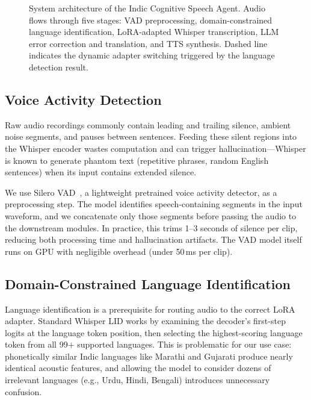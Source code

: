 \begin{figure}[t]
\caption{System architecture of the Indic Cognitive Speech Agent. Audio flows through five stages: VAD preprocessing, domain-constrained language identification, LoRA-adapted Whisper transcription, LLM error correction and translation, and TTS synthesis. Dashed line indicates the dynamic adapter switching triggered by the language detection result.}
\label{fig:architecture}
\end{figure}

\subsection{Voice Activity Detection}
\label{sec:vad}

Raw audio recordings commonly contain leading and trailing silence, ambient noise segments, and pauses between sentences. Feeding these silent regions into the Whisper encoder wastes computation and can trigger hallucination---Whisper is known to generate phantom text (repetitive phrases, random English sentences) when its input contains extended silence.

We use Silero VAD~\cite{silero_vad}, a lightweight pretrained voice activity detector, as a preprocessing step. The model identifies speech-containing segments in the input waveform, and we concatenate only those segments before passing the audio to the downstream modules. In practice, this trims 1--3 seconds of silence per clip, reducing both processing time and hallucination artifacts. The VAD model itself runs on GPU with negligible overhead (under 50\,ms per clip).

\subsection{Domain-Constrained Language Identification}
\label{sec:lid}

Language identification is a prerequisite for routing audio to the correct LoRA adapter. Standard Whisper LID works by examining the decoder's first-step logits at the language token position, then selecting the highest-scoring language token from all 99+ supported languages. This is problematic for our use case: phonetically similar Indic languages like Marathi and Gujarati produce nearly identical acoustic features, and allowing the model to consider dozens of irrelevant languages (e.g., Urdu, Hindi, Bengali) introduces unnecessary confusion.

